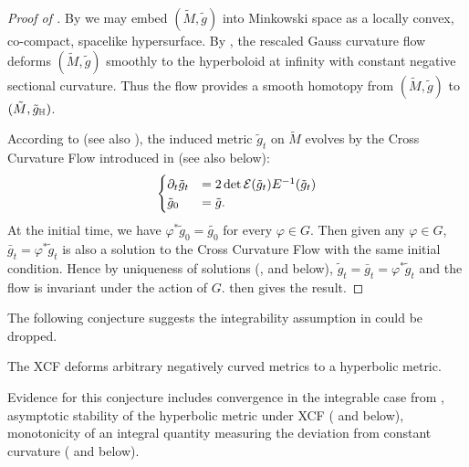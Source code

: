 \documentclass[a4paper,12pt]{amsart}
\begin{document}
\begin{proof}
[Proof of ]

By  we may embed \((\tilde{M}, \tilde{g})\) into Minkowski space as a locally convex, co-compact, spacelike hypersurface. By \cite[Theorem 1.1]{MR3344442}, the rescaled Gauss curvature flow deforms \((\tilde{M}, \tilde{g})\) smoothly to the hyperboloid at infinity with constant negative sectional curvature. Thus the flow provides a smooth homotopy from \((\tilde{M}, \tilde{g})\) to \((\tilde{M}, \tilde{g}_{\mathbb{H}})\).

According to \cite[Section 12]{MR3344442} (see also ), the induced metric \(\tilde{g}_t\) on \(\tilde{M}\) evolves by the Cross Curvature Flow introduced in \cite{MR2055396} (see also  below):
\[
\begin{cases}
\partial_t \tilde{g}_t &= 2\det \operatorname{\mathcal{E}}(\tilde{g}_{t}) E^{-1}(\tilde{g}_{t}) \\
\tilde{g}_0 &= \tilde{g}.
\end{cases}
\]
At the initial time, we have \(\varphi^{\ast} \tilde{g}_0 = \tilde{g_0}\) for every \(\varphi \in G\). Then given any \(\varphi \in G\), \(\bar{g}_t = \varphi^{\ast} \tilde{g}_t\) is also a solution to the Cross Curvature Flow with the same initial condition. Hence by uniqueness of solutions (\cite{MR2055396,MR2207496},  and  below), \(\tilde{g}_t = \bar{g}_t = \varphi^{\ast} \tilde{g}_t\) and the flow is invariant under the action of \(G\).  then gives the result.
\end{proof}

The following conjecture suggests the integrability assumption in  could be dropped.

\begin{conj}[\cite{MR2055396}]
\label{conj:chow_hamilton}

The XCF deforms arbitrary negatively curved metrics to a hyperbolic metric.
\end{conj}

Evidence for this conjecture includes convergence in the integrable case from , asymptotic stability of the hyperbolic metric under XCF (\cite{MR2448593} and  below), monotonicity of an integral quantity measuring the deviation from constant curvature (\cite{MR2055396} and  below).
\end{document}

